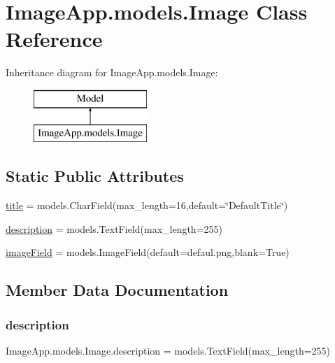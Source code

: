 \hypertarget{class_image_app_1_1models_1_1_image}{}\section{Image\+App.\+models.\+Image Class Reference}
\label{class_image_app_1_1models_1_1_image}
Inheritance diagram for Image\+App.\+models.\+Image\+:\begin{figure}[H]
\begin{center}
\leavevmode
\includegraphics[height=2.000000cm]{class_image_app_1_1models_1_1_image}
\end{center}
\end{figure}
\subsection*{Static Public Attributes}
\begin{DoxyCompactItemize}
\item 
\mbox{\hyperlink{class_image_app_1_1models_1_1_image_a22b593efe01ca4fd50122621459c4d0e}{title}} = models.\+Char\+Field(max\+\_\+length=16,default=\char`\"{}Default\+Title\char`\"{})
\item 
\mbox{\hyperlink{class_image_app_1_1models_1_1_image_a03e91c21c4224a3d7219e8cdc8186aec}{description}} = models.\+Text\+Field(max\+\_\+length=255)
\item 
\mbox{\hyperlink{class_image_app_1_1models_1_1_image_a51e14dc1cb0478dd234a0ed900dd97f7}{image\+Field}} = models.\+Image\+Field(default=\textquotesingle{}defaul.\+png\textquotesingle{},blank=True)
\end{DoxyCompactItemize}


\subsection{Member Data Documentation}
\mbox{\label{class_image_app_1_1models_1_1_image_a03e91c21c4224a3d7219e8cdc8186aec}} 
\subsubsection{\texorpdfstring{description}{description}}
{\footnotesize\ttfamily Image\+App.\+models.\+Image.\+description = models.\+Text\+Field(max\+\_\+length=255)\hspace{0.3cm}{\ttfamily [static]}}


